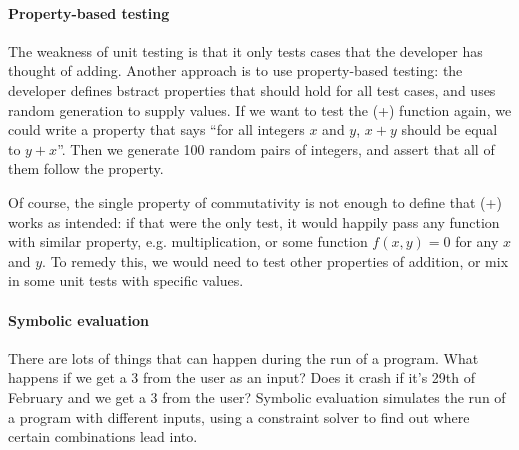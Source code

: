 \paragraph{Property-based testing}

The weakness of unit testing is that it only tests cases that the
developer has thought of adding. Another approach is to use
property-based testing: the developer defines bstract properties that
should hold for all test cases, and uses random generation to supply
values. If we want to test the (+) function again, we could write a
property that says ``for all integers $x$ and $y$, $x+y$ should be
equal to $y+x$''. Then we generate 100 random pairs of integers, and
assert that all of them follow the property. 

Of course, the single property of commutativity is not enough to
define that (+) works as intended: if that were the only test, it
would happily pass any function with similar property,
e.g. multiplication, or some function $f(x, y) = 0$ for any $x$
and $y$. To remedy this, we would need to test other properties of
addition, or mix in some unit tests with specific values.



\paragraph{Symbolic evaluation}

There are lots of things that can happen during the run of a
program. What happens if we get a 3 from the user as an input? Does it
crash if it's 29th of February and we get a 3 from the user?  Symbolic 
evaluation simulates the run of a program with different inputs, using 
a constraint solver to find out where certain combinations lead into.



